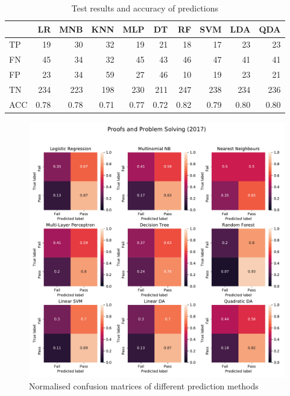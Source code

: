 \documentclass[a4paper]{report}
\begin{document}
\begin{table}[H]
  \centering
  \begin{tabular}{lrrrrrrrrr}
    \toprule
    {} &   LR &  MNB &  KNN &  MLP &   DT &   RF &  SVM &  LDA &  QDA \\
    \midrule
    TP  &   19 &   30 &   32 &   19 &   21 &   18 &   17 &   23 &   23 \\
    FN  &   45 &   34 &   32 &   45 &   43 &   46 &   47 &   41 &   41 \\
    FP  &   23 &   34 &   59 &   27 &   46 &   10 &   19 &   23 &   21 \\
    TN  &  234 &  223 &  198 &  230 &  211 &  247 &  238 &  234 &  236 \\
    ACC & 0.78 & 0.78 & 0.71 & 0.77 & 0.72 & 0.82 & 0.79 & 0.80 & 0.80 \\
    \bottomrule
  \end{tabular}
  \caption{\label{tab:ML_CAP_bin_Qual_17}Test results and accuracy of predictions}
\end{table}

\begin{figure}[H]
  \centering
  \includegraphics[width=\linewidth]{fig/ML_PPS_bin_Qual_17.pdf}
  \caption{\label{fig:ML_PPS_bin_Qual_17}Normalised confusion matrices of different prediction methods}
\end{figure}
\end{document}
